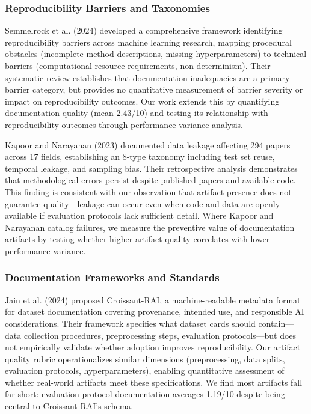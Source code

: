 
\subsubsection{Reproducibility Barriers and Taxonomies}

Semmelrock et al. (2024) developed a comprehensive framework identifying reproducibility barriers across machine learning research, mapping procedural obstacles (incomplete method descriptions, missing hyperparameters) to technical barriers (computational resource requirements, non-determinism). Their systematic review establishes that documentation inadequacies are a primary barrier category, but provides no quantitative measurement of barrier severity or impact on reproducibility outcomes. Our work extends this by quantifying documentation quality (mean 2.43/10) and testing its relationship with reproducibility outcomes through performance variance analysis.

Kapoor and Narayanan (2023) documented data leakage affecting 294 papers across 17 fields, establishing an 8-type taxonomy including test set reuse, temporal leakage, and sampling bias. Their retrospective analysis demonstrates that methodological errors persist despite published papers and available code. This finding is consistent with our observation that artifact presence does not guarantee quality---leakage can occur even when code and data are openly available if evaluation protocols lack sufficient detail. Where Kapoor and Narayanan catalog failures, we measure the preventive value of documentation artifacts by testing whether higher artifact quality correlates with lower performance variance.

\subsubsection{Documentation Frameworks and Standards}

Jain et al. (2024) proposed Croissant-RAI, a machine-readable metadata format for dataset documentation covering provenance, intended use, and responsible AI considerations. Their framework specifies what dataset cards should contain---data collection procedures, preprocessing steps, evaluation protocols---but does not empirically validate whether adoption improves reproducibility. Our artifact quality rubric operationalizes similar dimensions (preprocessing, data splits, evaluation protocols, hyperparameters), enabling quantitative assessment of whether real-world artifacts meet these specifications. We find most artifacts fall far short: evaluation protocol documentation averages 1.19/10 despite being central to Croissant-RAI's schema.

